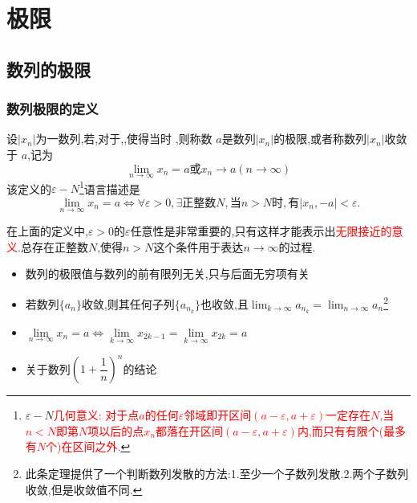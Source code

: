\documentclass[9pt a4paper, oneside, UTF8]{ctexbook}
\begin{document}
\begin{sloppypar}
    \else
    \fi
    \chapter{极限}
    \section{数列的极限}
    \subsection{数列极限的定义}
    \begin{defn}{}{}
        设$|x_n|$为一数列,若,对于,,使得当时 ,则称数 $a$是数列$| x_n |$的极限,或者称数列$| x_n |$收敛于 $a$,记为
        $$
            \lim_{n\to\infty}x_n=a\text{或}x_n\to a(n\to\infty)
        $$
        该定义的$\varepsilon-N$\footnote{$\varepsilon - N$\textcolor{red}{几何意义: 对于点$a$的任何$\varepsilon$邻域即开区间$(a-\varepsilon,a+\varepsilon)$一定存在$N$,当$n < N$即第$N$项以后的点$x_n$都落在开区间$(a-\varepsilon,a+\varepsilon)$内,而只有有限个(最多有$N$个)在区间之外.}}语言描述是
        \newline
        $$\lim_{n\to\infty}x_n=a\Leftrightarrow\forall\varepsilon>0,\exists\text{正整数}N,\text{当}n>N\text{时},\text{有}|x_n,-a|<\varepsilon.$$
    \end{defn}
    在上面的定义中,$\varepsilon>0$的$\varepsilon$任意性是非常重要的,只有这样才能表示出\textcolor{red}{无限接近的意义}.总存在正整数$N$,使得$n>N$这个条件用于表达$n \to \infty$的过程.
    \begin{criterion}{}{}
        \begin{itemize}
            \item 数列的极限值与数列的前有限列无关,只与后面无穷项有关
            \item 若数列$\{a_n\}$收敛,则其任何子列$\{a_{n_k}\}$也收敛,且$\lim_{k\to\infty}a_{n_k}=\lim_{n\to\infty}a_n$\footnote{ 此条定理提供了一个判断数列发散的方法:1.至少一个子数列发散.2.两个子数列收敛,但是收敛值不同.}
            \item $\underset{n\to\infty}{\operatorname*{\lim}}x_n=a\Leftrightarrow\underset{k\to\infty}{\operatorname*{\lim}}x_{2k-1}=\underset{k\to\infty}{\operatorname*{\lim}}x_{2k}=a$
            \item 关于数列$(1+\dfrac{1}{n})^n$的结论

\end{itemize}
\end{criterion}
\end{sloppypar}
\end{document}
